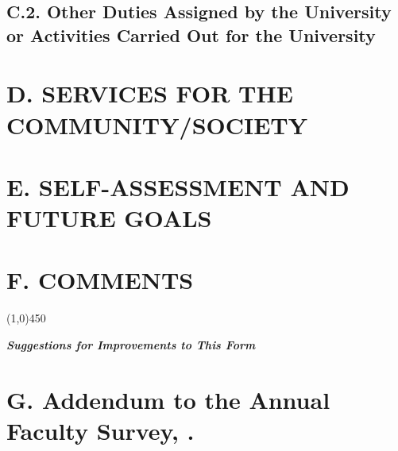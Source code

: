 \documentclass[10pt]{article}
\begin{document}


\subsection*{C.2. Other Duties Assigned by the University or Activities Carried Out for the University}




\section*{D. SERVICES FOR THE COMMUNITY/SOCIETY}



\section*{E. SELF-ASSESSMENT AND FUTURE GOALS}



\section*{F. COMMENTS}





\begin{center}
\line(1,0){450}
\end{center}
{\large\textbf {\textit {Suggestions for Improvements to This Form}}}



\clearpage

\section*{G. Addendum to the Annual Faculty Survey, \the\year.}
\end{document}
